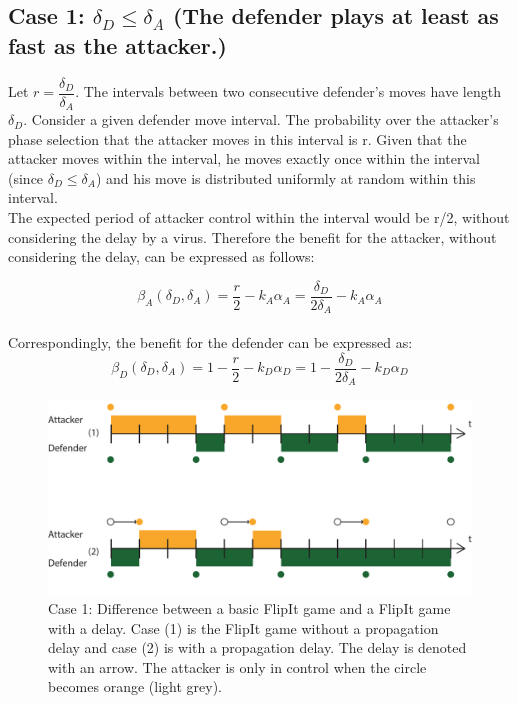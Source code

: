 \subsection*{\textbf{Case 1:} $\delta_{D} \leq \delta_{A} $ (The defender plays at least as fast as the attacker.) }

Let $r = \dfrac{\delta_{D}}{ \delta_{A} }$. The intervals between two consecutive defender's moves have length $\delta_{D}$. Consider a given defender move interval. The probability over the attacker's phase selection that the attacker moves in this interval is r. Given that the attacker moves within the interval, he moves exactly once within the interval (since $\delta_{D} \leq \delta_{A} $) and his move is distributed uniformly at random within this interval. \\

The expected period of attacker control within the interval would be r/2, without considering the delay by a virus. Therefore the benefit for the attacker, without considering the delay, can be expressed as follows:

\begin{equation*}
\beta_{A}(\delta_{D},\delta_{A}) =\dfrac {r} {2} - k_{A} \alpha_{A} = \dfrac {\delta_{D}} {2\delta_{A}} - k_{A} \alpha_{A}  
\end{equation*}\\

Correspondingly, the benefit for the defender can be expressed as:
\begin{equation*}
\beta_{D}(\delta_{D},\delta_{A}) =1 -  \dfrac {r} {2} - k_{D} \alpha_{D} = 1 - \dfrac {\delta_{D}} {2\delta_{A}} - k_{D} \alpha_{D} 
\end{equation*}

\begin{figure}[hbtp]
\centering
\includegraphics[scale=0.7]{../../doc/template/Images/DiffDelayCase1.pdf}
\caption{Case 1: Difference between a basic FlipIt game and a FlipIt game with a delay. Case (1) is the FlipIt game without a propagation delay and case (2) is with a propagation delay. The delay is denoted with an arrow. The attacker is only in control when the circle becomes orange (light grey).}
\label{fig:delaycase1}
\end{figure}




